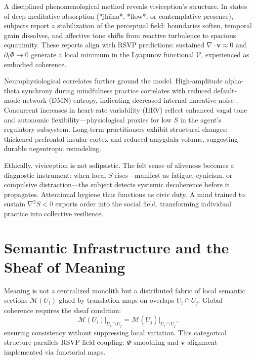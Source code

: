 \documentclass[12pt,a4paper]{article}
\begin{document}
A disciplined phenomenological method reveals viviception’s structure. In states of deep meditative absorption (*jhāna*, *flow*, or contemplative presence), subjects report a stabilization of the perceptual field: boundaries soften, temporal grain dissolves, and affective tone shifts from reactive turbulence to spacious equanimity. These reports align with RSVP predictions: sustained $\nabla\!\cdot\!\bm{v} \approx 0$ and $\partial_t \Phi \to 0$ generate a local minimum in the Lyapunov functional $\mathcal{V}$, experienced as embodied coherence.

Neurophysiological correlates further ground the model. High-amplitude alpha-theta synchrony during mindfulness practice correlates with reduced default-mode network (DMN) entropy, indicating decreased internal narrative noise \cite{lutz2008regulation}. Concurrent increases in heart-rate variability (HRV) reflect enhanced vagal tone and autonomic flexibility—physiological proxies for low $S$ in the agent’s regulatory subsystem. Long-term practitioners exhibit structural changes: thickened prefrontal-insular cortex and reduced amygdala volume, suggesting durable negentropic remodeling.

Ethically, viviception is not solipsistic. The felt sense of aliveness becomes a diagnostic instrument: when local $S$ rises—manifest as fatigue, cynicism, or compulsive distraction—the subject detects systemic decoherence before it propagates. Attentional hygiene thus functions as civic duty. A mind trained to sustain $\nabla^2 S < 0$ exports order into the social field, transforming individual practice into collective resilience.

\section{Semantic Infrastructure and the Sheaf of Meaning}
Meaning is not a centralized monolith but a distributed fabric of local semantic sections $\mathcal{M}(U_i)$ glued by translation maps on overlaps $U_i \cap U_j$. Global coherence requires the sheaf condition:
\begin{equation}
\mathcal{M}(U_i)\big|_{U_i\cap U_j} = \mathcal{M}(U_j)\big|_{U_i\cap U_j},
\label{eq:sheaf-condition}
\end{equation}
ensuring consistency without suppressing local variation. This categorical structure parallels RSVP field coupling: $\Phi$-smoothing and $\bm{v}$-alignment implemented via functorial maps.
\end{document}
